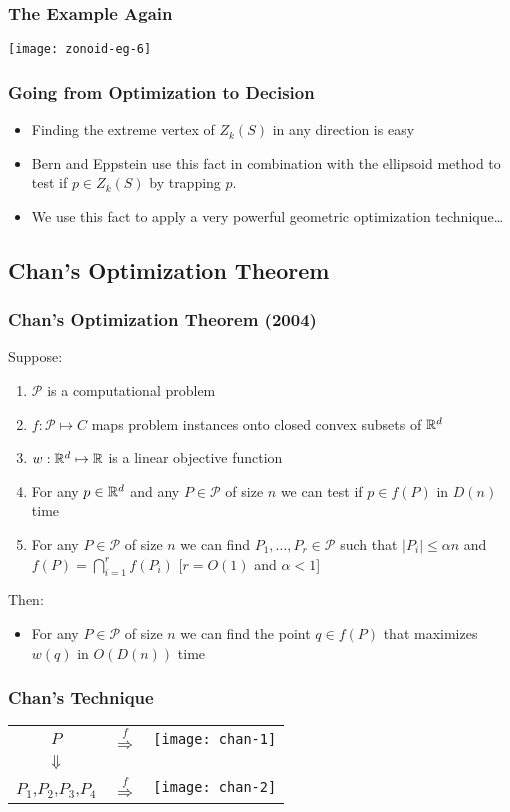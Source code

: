 \documentclass{beamer}
\begin{document}
\frame
{
   \frametitle{The Example Again}
   \begin{center}
    \texttt{[image: zonoid-eg-6]}
   \end{center}
}



\frame
{
   \frametitle{Going from Optimization to Decision}
 \begin{itemize}
   \item<1->Finding the extreme vertex of $Z_k(S)$ in any direction
	is easy
   \item<2->Bern and Eppstein use this fact in combination with the 
	ellipsoid method to test if 
	$p\in Z_k(S)$ by trapping $p$.
   \item<3-> We use this fact to apply a very powerful
	geometric optimization technique\ldots
  \end{itemize}
}

\subsection{Chan's Optimization Theorem}
\frame
{
  \frametitle{Chan's Optimization Theorem (2004)}
  Suppose:  
  \begin{enumerate}
   \item<1-> $\mathcal{P}$ is a computational problem
   \item<2-> $f:\mathcal{P}\mapsto C$ maps problem instances onto closed 
         convex subsets of $\mathbb{R}^d$
   \item<3-> $w:\mathbb{R}^d\mapsto \mathbb{R}$ is a linear objective function
   \item<5-> For any $p\in\mathbb{R}^d$ and any $P\in\mathcal{P}$ of size $n$ we
         can test if $p\in f(P)$ in $D(n)$ time
   \item<6-> For any $P\in\mathcal{P}$ of size $n$ we can find
         $P_1,\ldots, P_r\in\mathcal{P}$ such that $|P_i|\le\alpha n$ 
         and $f(P)=\bigcap_{i=1}^r f(P_i)$ \hfill{[$r=O(1)$ and $\alpha<1$]}
  \end{enumerate}
  Then:
  \begin{itemize}
    \item<4-> For any $P\in\mathcal{P}$ of size $n$ we can find the point
    $q\in f(P)$ that maximizes $w(q)$ in $O(D(n))$ time
  \end{itemize}
} 

\frame
{
   \frametitle{Chan's Technique}

   \begin{center}
   \begin{tabular}{ccc}
    $P$ & $\stackrel{f}{\Rightarrow}$ & \texttt{[image: chan-1]} \\
    $\Downarrow$ \\
    $P_1$,$P_2$,$P_3$,$P_4$ & $\stackrel{f}{\Rightarrow}$ 
	& \texttt{[image: chan-2]} \\
   \end{tabular}
   \end{center}
}
\end{document}
